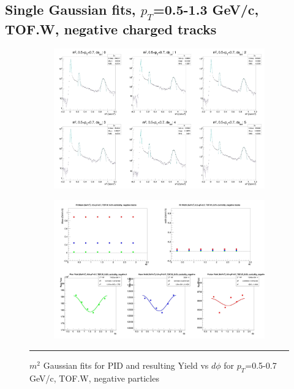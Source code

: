 \subsection{Single Gaussian fits, $p_T$=0.5-1.3 GeV/c, TOF.W, negative charged tracks}
\label{app:singlegauss}
\begin{figure}[H]
  \centering
    \begin{subfigure}{1\textwidth}
    \includegraphics[width=1\textwidth]{lowptfits/yieldvsdphi_tof1_cent0_ch0_pT-5-7.jpg}
    \end{subfigure}
    \begin{subfigure}{1\textwidth}
    \includegraphics[width=1\textwidth]{lowptfits/fitParams_tof1_cent0_ch0_pT-5-7.jpg}
    \end{subfigure}
    \rule{35em}{0.5pt}
  \caption[PID fits and Yield vs $d\phi$ for $p_T$=0.5-0.7 GeV/c, TOF.W, negative particles ]{$m^2$ Gaussian fits for PID and resulting Yield vs $d\phi$ for $p_T$=0.5-0.7 GeV/c, TOF.W, negative particles}
  \label{fig:fits5-7neg}
\end{figure}

